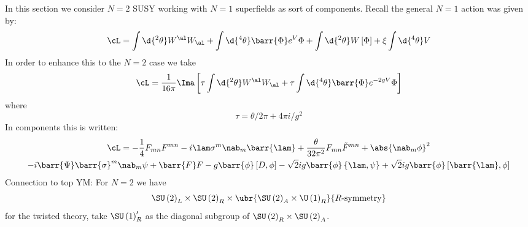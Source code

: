 \documentclass{booc}
\begin{document}
In this section we consider $N = 2$ SUSY
working with $N = 1$ superfields as sort of components.
Recall the general $N = 1$ action was given by:
\begin{equation}
\cL = \int\d{^2 \theta} W^\al W_\al + \int \d{^4 \theta} \barr{\Phi} e^V \Phi
+ \int \d{^2 \theta} W\left[ \Phi \right] + \xi \int \d{^4 \theta} V
\end{equation}
In order to enhance this to the $N= 2$ case we take
\begin{equation}
\cL = \frac{1}{16\pi} \Ima\left[ 
\tau \int \d{^2 \theta}W^\al W_\al + \tau \int \d{^4 \theta}\barr{\Phi} e^{-2gV} \Phi\right]
\end{equation}
where 
\begin{equation}
\tau = \theta / 2\pi +  4\pi i / g^2
\end{equation}
In components this is written:
\begin{multline}
\cL = - \frac{1}{4} F_{mn}F^{mn} - i \lam \sigma^m \nab_m \barr{\lam} + 
\frac{\theta}{32\pi^2} F_{mn}\tilde F^{mn}
+ \abs{\nab_m \phi}^2 \\
- i \barr{\Psi}\barr{\sigma}^m \nab_m \psi + \barr{F} F 
- g\barr{\phi} \left[ D , \phi \right]
-\sqrt{2} i g \barr{\phi} \left\{ \lam , \psi \right\} + 
\sqrt{2} i g \barr{\phi} \left[ \barr{\lam} , \phi \right]
\end{multline}
Connection to top YM:
For $N = 2$ we have
\begin{equation}
\SU\left( 2 \right)_L \times \SU\left( 2 \right)_R \times
\ubr{\SU\left( 2 \right)_A \times \U\left( 1 \right)_R}{R\text{-symmetry}}
\end{equation}
for the twisted theory, take $\SU\left( 1 \right)_R'$ as the diagonal subgroup of 
$\SU\left( 2 \right)_R\times \SU\left( 2 \right)_A$.
\end{document}
